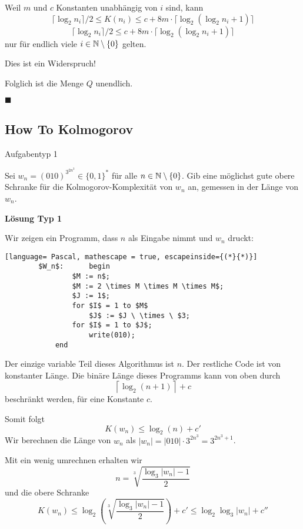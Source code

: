     Weil $m$ und $c$ Konstanten unabhängig von $i$ sind, kann 
    $$\lceil \log_2 n_i \rceil / 2 \leq K(n_i) \leq c + 8m \cdot \lceil \log_2(\log_2 n_i + 1)\rceil$$
    $$\lceil \log_2 n_i \rceil/2 \leq c + 8m \cdot \lceil \log_2(\log_2 n_i + 1)\rceil$$
    nur für endlich viele $i \in \mathbb{N} \setminus \{0\}$ gelten. 

    Dies ist ein Widerspruch! 

    Folglich ist die Menge $Q$ unendlich.

    \hspace*{0pt}\hfill$\blacksquare$



\subsection{How To Kolmogorov}



    \begin{subbox}{Aufgabentyp 1}

    Sei $w_n = (010)^{3^{2n^3}} \in \{0,1\}^*$ für alle $n \in \mathbb{N} \setminus \{0\}$. Gib eine möglichst gute obere Schranke für die Kolmogorov-Komplexität von $w_n$ an, gemessen in der Länge von $w_n$.
    \end{subbox}

    \textbf{Lösung Typ 1}
    
    Wir zeigen ein Programm, dass $n$ als Eingabe nimmt und $w_n$ druckt:
    \begin{lstlisting}[language= Pascal, mathescape = true, escapeinside={(*}{*)}]
        $W_n$:     	begin
                $M := n$;
                $M := 2 \times M \times M \times M$;
                $J := 1$;
                for $I$ = 1 to $M$                  
                    $J$ := $J \ \times \ $3;
                for $I$ = 1 to $J$;
                    write(010);
            end
    \end{lstlisting}

    Der einzige variable Teil dieses Algorithmus ist $n$. Der restliche Code ist von konstanter Länge. Die binäre Länge dieses Programms kann von oben durch 
    $$\left\lceil\log_2(n+1)\right\rceil + c$$
    beschränkt werden, für eine Konstante $c$.

    Somit folgt
    $$K(w_n) \leq \log_2(n) + c'$$
    Wir berechnen die Länge von $w_n$ als $|w_n| = |010| \cdot 3^{2n^3} = 3^{2n^3+1}$. 
    
    Mit ein wenig umrechnen erhalten wir $$n = \sqrt[3]{\frac{\log_3|w_n| - 1}{2}}$$
    und die obere Schranke
    $$K(w_n) \leq \log_2 \left(\sqrt[3]{\frac{\log_3|w_n| - 1}{2}}\right)+ c' \leq \log_2 \log_3 |w_n| + c''$$

